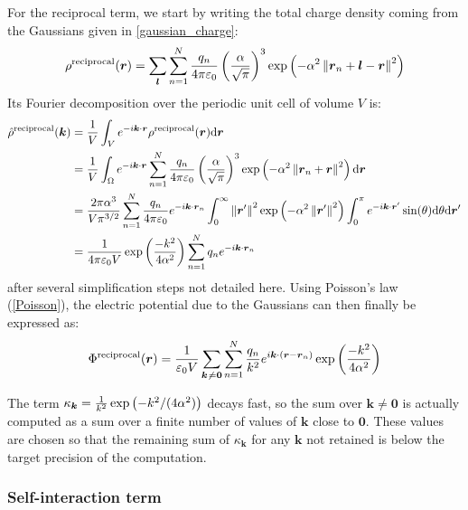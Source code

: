 \documentclass[main.tex]{subfiles}
\begin{document}
For the reciprocal term, we start by writing the total charge density coming from the Gaussians given in \cref{gaussian_charge}:
\[\rho^\text{reciprocal}(\boldsymbol r) = \sum_{\boldsymbol l}\sum_{n=1}^N \frac{q_n}{4\pi\varepsilon_0}\left(\frac\alpha{\sqrt\pi}\right)^3\exp\left(-\alpha^2\left\|\boldsymbol r_n + \boldsymbol l - \boldsymbol r\right\|^2\right)\]
Its Fourier decomposition over the periodic unit cell of volume $V$ is:
\[\begin{split}
\hat\rho^\text{reciprocal}(\boldsymbol k) &= \frac1V\int_V e^{-i\boldsymbol k\cdot\boldsymbol r} \rho^\text{reciprocal}(\boldsymbol r)\text d\boldsymbol r
\\&= \frac1V\int_\Omega e^{-i\boldsymbol k\cdot\boldsymbol r} \sum_{n=1}^N \frac{q_n}{4\pi\varepsilon_0} \left(\frac\alpha{\sqrt\pi}\right)^3\exp\left(-\alpha^2\left\|\boldsymbol r_n + \boldsymbol r\right\|^2\right) \text d\boldsymbol r
\\&= \frac{2\pi\alpha^3}{V\pi^{3/2}} \sum_{n=1}^N \frac{q_n}{4\pi\varepsilon_0} e^{-i\boldsymbol k\cdot\boldsymbol r_n} \int_0^\infty \left\|\boldsymbol{r}'\right\|^2\exp\left(-\alpha^2 \left\|\boldsymbol{r}'\right\|^2\right)\int_0^\pi e^{-i\boldsymbol k\cdot\boldsymbol{r}'} \sin(\theta) \text d \theta \text d \boldsymbol{r}'
\\&= \frac1{4\pi\varepsilon_0V}\exp\left(\frac{-k^2}{4\alpha^2}\right)\sum_{n=1}^N q_n e^{-i\boldsymbol k\cdot\boldsymbol r_n}\end{split}\]
after several simplification steps not detailed here. Using Poisson's law (\cref{Poisson}), the electric potential due to the Gaussians can then finally be expressed as:
\[\Phi^\text{reciprocal}(\boldsymbol r) = \frac{1}{\varepsilon_0V}\sum_{\boldsymbol k\not\kern0.2ex= \boldsymbol 0}\sum_{n=1}^N \frac{q_n}{k^2} e^{i\boldsymbol k\cdot\left(\boldsymbol r - \boldsymbol r_n\right)}\exp\left(\frac{-k^2}{4\alpha^2}\right)\label{eq:reciprocal}\]

The term $\kappa_{\boldsymbol{k}} = \frac1{k^2}\exp\left(-k^2/(4\alpha^2)\right)$ decays fast, so the sum over $\boldsymbol{k}\neq\boldsymbol{0}$ is actually computed as a sum over a finite number of values of $\boldsymbol{k}$ close to $\boldsymbol{0}$. These values are chosen so that the remaining sum of $\kappa_{\boldsymbol{k}}$ for any $\boldsymbol{k}$ not retained is below the target precision of the computation.

\subsubsection{Self-interaction term}
\end{document}
